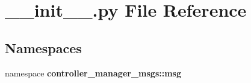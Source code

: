 \section{\-\_\-\-\_\-init\-\_\-\-\_\-.\-py \-File \-Reference}
\label{msg_2____init_____8py}
\subsection*{\-Namespaces}
\begin{DoxyCompactItemize}
\item 
namespace {\bf controller\-\_\-manager\-\_\-msgs\-::msg}
\end{DoxyCompactItemize}
